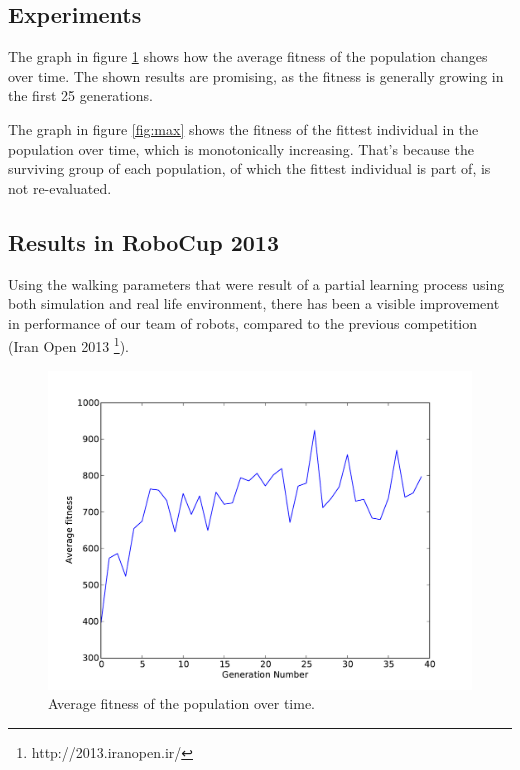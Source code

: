 \documentclass{article}
\begin{document}
\subsection{Experiments}
The graph in figure \ref{fig:avg} shows how the average fitness of the population changes over time. The shown results are promising, as the fitness is generally growing in the first 25 generations. 

The graph in figure \ref{fig:max} shows the fitness of the fittest individual in the population over time, which is monotonically increasing. That's because the surviving group of each population, of which the fittest individual is part of, is not re-evaluated. 

\subsection{Results in RoboCup 2013}
Using the walking parameters that were result of a partial learning process using both simulation and real life environment, there has been a visible improvement in performance of our team of robots, compared to the previous competition (Iran Open 2013  \footnote{http://2013.iranopen.ir/}). 

\begin{figure}
	\center
	\includegraphics[width=.8\textwidth]{images/fitness}
	\caption{Average fitness of the population over time.}
	\label{fig:avg}
\end{figure}
\end{document}

